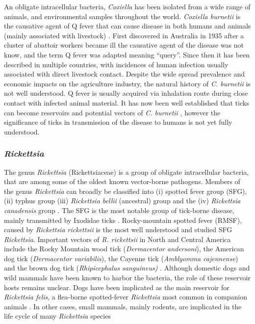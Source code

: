 \documentclass[a4paper, nobind]{templates/ociamthesis}
\begin{document}
An obligate intracellular bacteria, \emph{Coxiella} has been isolated from a wide range of animals, and environmental samples throughout the world.
\emph{Coxiella burnetii} is the causative agent of Q fever that can cause disease in both humans and animals (mainly associated with livestock) \autocite{gonzalez-barrioCoxiellaBurnetiiWild2018}.
First discovered in Australia in 1935 after a cluster of abattoir workers became ill \autocite{derrickFEVERNEWFEVER1937} the causative agent of the disease was not know, and the term Q fever was adapted meaning ``query''.
Since then it has been described in multiple countries, with incidences of human infection usually associated with direct livestock contact.
Despite the wide spread prevalence and economic impacts on the agriculture industry, the natural history of \emph{C. burnetii} is not well understood.
Q fever is usually acquired via inhalation route during close contact with infected animal material.
It has now been well established that ticks can become reservoirs and potential vectors of \emph{C. burnetii} \autocite{arricau-bouveryFeverEmergingReemerging2005}, however the significance of ticks in transmission of the disease to humans is not yet fully understood.

\hypertarget{rickettsia}{%
\subsubsection{\texorpdfstring{\emph{Rickettsia}}{Rickettsia}}\label{rickettsia}}

The genus \emph{Rickettsia} (Rickettsiaceae) is a group of obligate intracellular bacteria, that are among some of the oldest known vector-borne pathogens.
Members of the genus \emph{Rickettsia} can broadly be classified into (i) spotted fever group (SFG), (ii) typhus group (iii) \emph{Rickettsia bellii} (ancestral) group and the (iv) \emph{Rickettsia canadensis} group \autocite{merhjRickettsialEvolutionLight2010}.
The SFG is the most notable group of tick-borne disease, mainly transmitted by Ixodidae ticks \autocite{parolaUpdateTickBorneRickettsioses2013}.
Rocky-mountain spotted fever (RMSF), caused by \emph{Rickettsia rickettsii} is the most well understood and studied SFG \emph{Rickettsia}.
Important vectors of \emph{R. rickettsii} in North and Central America include the Rocky Mountain wood tick (\emph{Dermacentor andersoni}), the American dog tick (\emph{Dermacentor variabilis}), the Cayenne tick (\emph{Amblyomma cajennense}) and the brown dog tick (\emph{Rhipicephalus sanguineus)} \autocite{dantas-torresRockyMountainSpotted2007,lopez-perezDiversityRickettsiaeDomestic2021}.
Although domestic dogs and wild mammals have been known to harbor the bacteria, the role of these reservoir hosts remains unclear.
Dogs have been implicated as the main reservoir for \emph{Rickettsia felis}, a flea-borne spotted-fever \emph{Rickettsia} most common in companion animals \autocite{ng-nguyenDomesticDogsAre2020}.
In other cases, small mammals, mainly rodents, are implicated in the life cycle of many \emph{Rickettsia} species \autocite{tomassoneNeglectedAspectsTickborne2018,parisBriefHistoryMajor2020}
\end{document}
